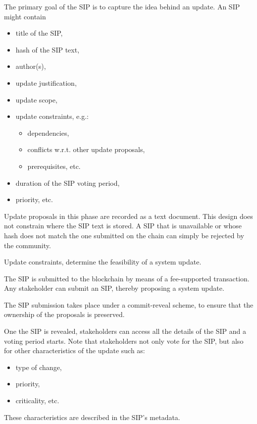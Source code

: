 \documentclass[11pt,a4paper]{article}
\begin{document}
The primary goal of the SIP is to capture the idea behind an update.
An SIP might contain
\begin{itemize}
\item title of the SIP,
\item hash of the SIP text,
\item author(s),
\item update justification,
\item update scope,
\item update constraints, e.g.:
  \begin{itemize}
  \item dependencies,
  \item conflicts w.r.t. other update proposals,
  \item prerequisites, etc.
  \end{itemize}
\item duration of the SIP voting period,
\item priority, etc.
\end{itemize}

Update proposals in this phase are recorded as a text document.
This design does not constrain where the SIP text is stored. A SIP that is
unavailable or whose hash does not match the one submitted on the chain can
simply be rejected by the community.

Update constraints, determine the feasibility of a system update.

The SIP is submitted to the blockchain by means of a fee-supported transaction.
Any stakeholder can submit an SIP, thereby proposing a system update.

The SIP submission takes place under a commit-reveal scheme, to ensure that the
ownership of the proposals is preserved.
%
%

One the SIP is revealed, stakeholders can access all the details of the SIP and
a voting period starts. Note that stakeholders not only vote for the SIP, but
also for other characteristics of the update such as:
\begin{itemize}
\item type of change,
\item priority,
\item criticality, etc.
\end{itemize}
These characteristics are described in the SIP's metadata.
\end{document}
